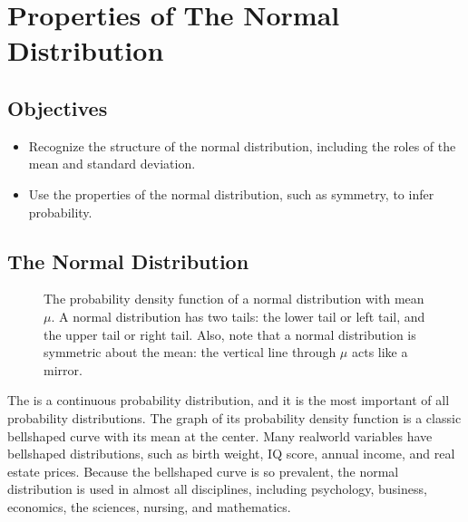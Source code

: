 \documentclass[letterpaper,10pt,english]{jupyterBook}
\begin{document}
\sphinxstepscope


\section{Properties of The Normal Distribution}
\label{\detokenize{Ch4 The Normal Distribution and the Central Limit Theorem/4.1 Properties of the Normal Distribution:properties-of-the-normal-distribution}}\label{\detokenize{Ch4 The Normal Distribution and the Central Limit Theorem/4.1 Properties of the Normal Distribution::doc}}

\subsection{Objectives}
\label{\detokenize{Ch4 The Normal Distribution and the Central Limit Theorem/4.1 Properties of the Normal Distribution:objectives}}\begin{itemize}
\item {} 
\sphinxAtStartPar
Recognize the structure of the normal distribution, including the roles of the mean and standard deviation.

\item {} 
\sphinxAtStartPar
Use the properties of the normal distribution, such as symmetry, to infer probability.

\end{itemize}


\subsection{The Normal Distribution}
\label{\detokenize{Ch4 The Normal Distribution and the Central Limit Theorem/4.1 Properties of the Normal Distribution:the-normal-distribution}}
\begin{figure}[htbp]
\centering
\capstart

\noindent{}
\caption{The probability density function of a normal distribution with mean \(\mu\). A normal distribution has two tails: the lower tail or left tail, and the upper tail or right tail. Also, note that a normal distribution is symmetric about the mean: the vertical line through \(\mu\) acts like a mirror.}\label{\detokenize{Ch4 The Normal Distribution and the Central Limit Theorem/4.1 Properties of the Normal Distribution:normal1}}\end{figure}

\sphinxAtStartPar
The  is a continuous probability distribution, and it is the most important of all probability distributions. The graph of its probability density function is a classic bell\sphinxhyphen{}shaped curve with its mean at the center. Many real\sphinxhyphen{}world variables have bell\sphinxhyphen{}shaped distributions, such as birth weight, IQ score, annual income, and real estate prices. Because the bell\sphinxhyphen{}shaped curve is so prevalent, the normal distribution is used in almost all disciplines, including psychology, business, economics, the sciences, nursing, and mathematics.
\end{document}
